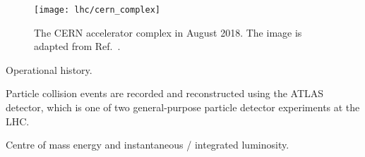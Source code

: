 \begin{figure}[htbp]
  \centering

  \texttt{[image: lhc/cern\_complex]}

  \caption{The CERN accelerator complex in August 2018. The image is adapted
    from Ref.~\cite{Mobs:2684277}.}%
  \label{fig:cern_accelerator_complex}
\end{figure}

Operational history.

Particle collision events are recorded and reconstructed using the ATLAS
detector, which is one of two general-purpose particle detector experiments at
the LHC.

Centre of mass energy and instantaneous / integrated luminosity.




